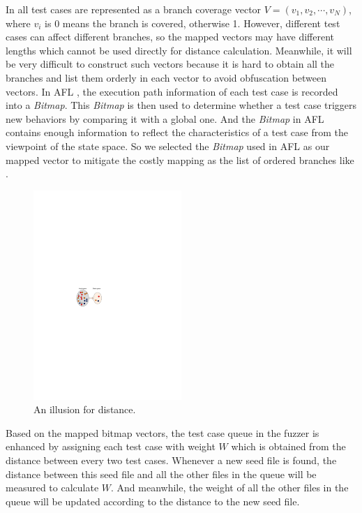 In \cite{wang2015similarity} all test cases are represented as a branch coverage vector $\mathit{V}=(v_1, v_2, \cdots, v_N)$, where $v_i$ is 0 means the branch is covered, otherwise 1. 
However, different test cases can affect different branches, so the mapped vectors may have different lengths which cannot be used directly for distance calculation. Meanwhile, it will be very difficult to construct such vectors because it is hard to obtain all the branches and list them orderly in each vector to avoid obfuscation between vectors. 
In AFL \cite{online:afl}, the execution path information of each test case is recorded into a \emph{Bitmap}. This \emph{Bitmap} is then used to determine whether a test case triggers new behaviors by comparing it with a global one. And the \emph{Bitmap} in AFL contains enough information to reflect the characteristics of a test case from the viewpoint of the state space. 
So we selected the \emph{Bitmap} used in AFL as our mapped vector to mitigate the costly mapping as the list of ordered branches like \cite{wang2015similarity}.

\begin{figure}
\centering
\includegraphics[width=0.5\textwidth]{figures/distance-illusion.pdf} 
\caption{An illusion for distance.}\label{distance-illusion}
\end{figure}

Based on the mapped bitmap vectors, the test case queue in the fuzzer is enhanced by assigning each test case with weight $W$ which is obtained from the distance between every two test cases. Whenever a new seed file is found, the distance between this seed file and all the other files in the queue will be measured to calculate $W$. And meanwhile, the weight of all the other files in the queue will be updated according to the distance to the new seed file. 

